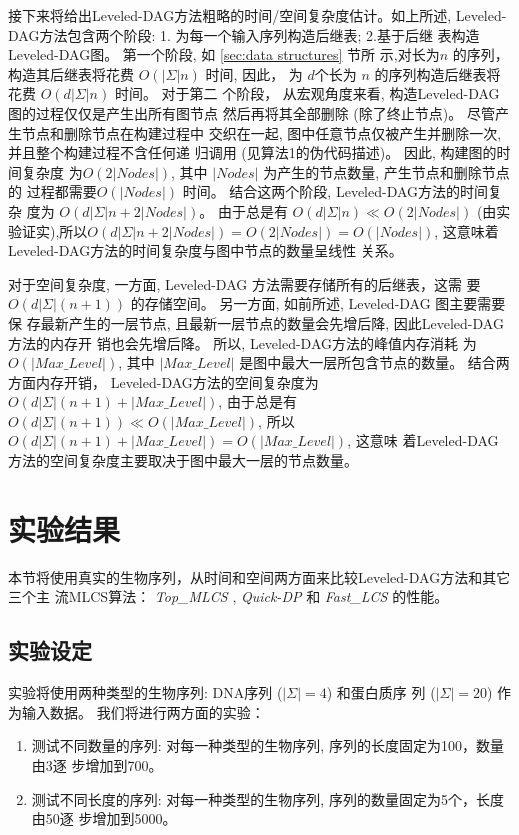 接下来将给出Leveled-DAG方法粗略的时间/空间复杂度估计。如上所述,
Leveled-DAG方法包含两个阶段: 1. 为每一个输入序列构造后继表; 2.基于后继
表构造Leveled-DAG图。 第一个阶段, 如 \ref{sec:data structures} 节所
示,对长为$n$ 的序列，构造其后继表将花费 $O(|\Sigma|n)$ 时间, 因此，
为 $d$个长为 $n$ 的序列构造后继表将花费 $O(d|\Sigma|n)$ 时间。 对于第二
个阶段， 从宏观角度来看, 构造Leveled-DAG 图的过程仅仅是产生出所有图节点
然后再将其全部删除 (除了终止节点)。 尽管产生节点和删除节点在构建过程中
交织在一起, 图中任意节点仅被产生并删除一次, 并且整个构建过程不含任何递
归调用 (见算法1的伪代码描述)。 因此, 构建图的时间复杂度
为$O(2|Nodes|)$, 其中 $|Nodes|$ 为产生的节点数量, 产生节点和删除节点的
过程都需要$O(|Nodes|)$ 时间。 结合这两个阶段, Leveled-DAG方法的时间复杂
度为 $O(d|\Sigma|n + 2|Nodes|)$。 由于总是有 $O(d|\Sigma|n) \ll
O(2|Nodes|)$
(由实验证实),所以$O(d|\Sigma|n + 2|Nodes|) = O(2|Nodes|) =
O(|Nodes|)$, 这意味着Leveled-DAG方法的时间复杂度与图中节点的数量呈线性
关系。

对于空间复杂度, 一方面, Leveled-DAG 方法需要存储所有的后继表，这需
要 $O(d|\Sigma|(n+1))$ 的存储空间。 另一方面, 如前所述, Leveled-DAG 图主要需要保
存最新产生的一层节点, 且最新一层节点的数量会先增后降, 因此Leveled-DAG方法的内存开
销也会先增后降。 所以, Leveled-DAG方法的峰值内存消耗
为 $O(|Max\_Level|)$, 其中 $|Max\_Level|$ 是图中最大一层所包含节点的数量。 结合两
方面内存开销， Leveled-DAG方法的空间复杂度为 $O(d|\Sigma|(n+1) + |Max\_Level|)$,
由于总是有 $O(d|\Sigma|(n+1)) \ll O(|Max\_Level|)$, 所以
$O(d|\Sigma|(n+1) + |Max\_Level|) = O(|Max\_Level|)$, 这意味
着Leveled-DAG方法的空间复杂度主要取决于图中最大一层的节点数量。


\section{实验结果}
\label{sec:4_experiments}

本节将使用真实的生物序列，从时间和空间两方面来比较Leveled-DAG方法和其它三个主
流MLCS算法： \emph{Top\_MLCS} \cite{Li2016_ICDE}, \emph{Quick-DP}
\cite{Wang2011} 和 \emph{Fast\_LCS} \cite{Chen2006} 的性能。

\subsection{实验设定}
\label{Test problems}

实验将使用两种类型的生物序列: DNA序列 ($|\Sigma|=4$) 和蛋白质序
列 ($|\Sigma|=20$) 作为输入数据。 我们将进行两方面的实验：

\begin{enumerate}
\item 测试不同数量的序列: 对每一种类型的生物序列, 序列的长度固定为100，数量由3逐
  步增加到700。
\item 测试不同长度的序列: 对每一种类型的生物序列, 序列的数量固定为5个，长度由50逐
  步增加到5000。
\end{enumerate}

